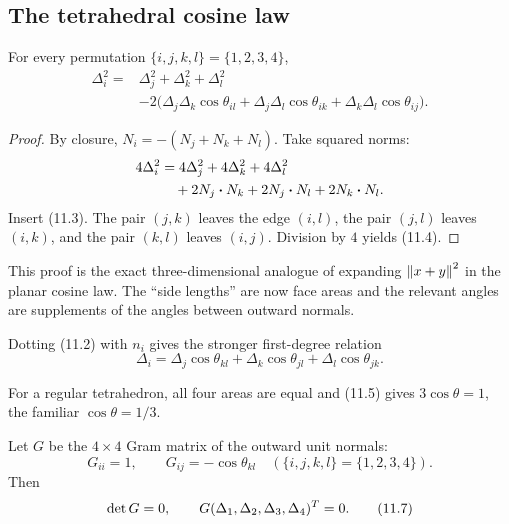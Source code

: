 \subsection{The tetrahedral cosine law}

\begin{theorem}
\label{thm:tetra-cosine}
For every permutation \(\{i,j,k,l\}=\{1,2,3,4\}\),
\begin{align}
 \Delta_i^2={}&\Delta_j^2+\Delta_k^2+\Delta_l^2\\
 &-2\bigl(
 \Delta_j\Delta_k\cos\theta_{il}
 +\Delta_j\Delta_l\cos\theta_{ik}
 +\Delta_k\Delta_l\cos\theta_{ij}
 \bigr).                                                    \tag{11.4}
\end{align}
\end{theorem}

\begin{proof}
By closure,
\(N_i=-(N_j+N_k+N_l)\).  Take squared norms:
\begin{align*}
 4\Delta_i^2
 &=4\Delta_j^2+4\Delta_k^2+4\Delta_l^2\\
 &\quad+2N_j\mathbin{\boldsymbol{\cdot}} N_k+2N_j\mathbin{\boldsymbol{\cdot}} N_l+2N_k\mathbin{\boldsymbol{\cdot}} N_l.
\end{align*}
Insert (11.3).  The pair \((j,k)\) leaves the edge \((i,l)\), the pair
\((j,l)\) leaves \((i,k)\), and the pair \((k,l)\) leaves \((i,j)\).
Division by \(4\) yields (11.4).
\end{proof}

This proof is the exact three-dimensional analogue of expanding
\(\left\lVert x+y\right\rVert^2\) in the planar cosine law.  The ``side lengths'' are now face
areas and the relevant angles are supplements of the angles between outward
normals.

\begin{corollary}
\label{cor:tetra-linear}
Dotting (11.2) with \(n_i\) gives the stronger first-degree relation
\begin{equation}
 \Delta_i=
 \Delta_j\cos\theta_{kl}+
 \Delta_k\cos\theta_{jl}+
 \Delta_l\cos\theta_{jk}.                                 \tag{11.5}
\end{equation}
\end{corollary}

For a regular tetrahedron, all four areas are equal and (11.5) gives
\(3\cos\theta=1\), the familiar \(\cos\theta=1/3\).

\begin{corollary}
Let \(G\) be the \(4\times4\) Gram matrix of the outward unit normals:
\begin{equation}
 G_{ii}=1,
 \qquad
 G_{ij}=-\cos\theta_{kl}
 \quad(\{i,j,k,l\}=\{1,2,3,4\}).                           \tag{11.6}
\end{equation}
Then
\begin{equation}
 \operatorname{det} G=0,
 \qquad
 G(\Delta_1,\Delta_2,\Delta_3,\Delta_4)^T=0.               \tag{11.7}
\end{equation}
\end{corollary}

